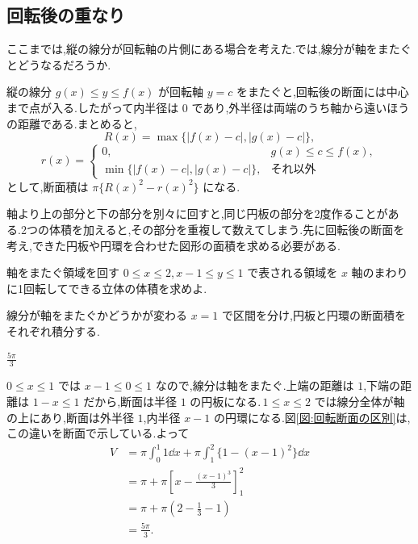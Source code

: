 \subsection{回転後の重なり}

ここまでは,縦の線分が回転軸の片側にある場合を考えた.では,線分が軸をまたぐとどうなるだろうか.

縦の線分 $g(x)\le y\le f(x)$ が回転軸 $y=c$ をまたぐと,回転後の断面には中心まで点が入る.したがって内半径は $0$ であり,外半径は両端のうち軸から遠いほうの距離である.まとめると,
\[
R(x)=\max\{|f(x)-c|,|g(x)-c|\},
\]
\[
r(x)=
\begin{cases}
0,&g(x)\le c\le f(x),\\
\min\{|f(x)-c|,|g(x)-c|\},&\text{それ以外}
\end{cases}
\]
として,断面積は $\pi\{R(x)^2-r(x)^2\}$ になる.

軸より上の部分と下の部分を別々に回すと,同じ円板の部分を2度作ることがある.2つの体積を加えると,その部分を重複して数えてしまう.先に回転後の断面を考え,できた円板や円環を合わせた図形の面積を求める必要がある.

\begin{example}{軸をまたぐ領域を回す}
$0\le x\le2$,\,$x-1\le y\le1$ で表される領域を $x$ 軸のまわりに1回転してできる立体の体積を求めよ.
\end{example}

線分が軸をまたぐかどうかが変わる $x=1$ で区間を分け,円板と円環の断面積をそれぞれ積分する.

$\frac{5\pi}{3}$

$0\le x\le1$ では $x-1\le0\le1$ なので,線分は軸をまたぐ.上端の距離は $1$,下端の距離は $1-x\le1$ だから,断面は半径 $1$ の円板になる.\,$1\le x\le2$ では線分全体が軸の上にあり,断面は外半径 $1$,内半径 $x-1$ の円環になる.図\ref{図:回転断面の区別}は,この違いを断面で示している.よって
\begin{align*}
V&=\pi\int_0^1 1\dd x+\pi\int_1^2\{1-(x-1)^2\}\dd x\\
 &=\pi+\pi\left[x-\frac{(x-1)^3}{3}\right]_1^2\\
 &=\pi+\pi\left(2-\frac13-1\right)\\
 &=\frac{5\pi}{3}.
\end{align*}


